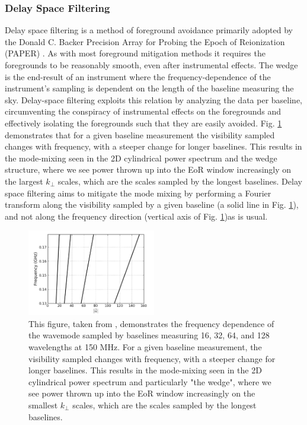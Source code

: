 \subsubsection{Delay Space Filtering}
Delay space filtering is a method of foreground avoidance primarily adopted by the Donald C. Backer Precision Array for Probing the Epoch of Reionization (PAPER) \citep{Parsons2010AJ....139.1468P}. As with most foreground mitigation methods it requires the foregrounds to be reasonably smooth, even after instrumental effects. The wedge is the end-result of an instrument where the frequency-dependence of the instrument's sampling is dependent on the length of the baseline measuring the sky. Delay-space filtering exploits this relation by analyzing the data per baseline, circumventing the conspiracy of instrumental effects on the foregrounds and effectively isolating the foregrounds such that they are easily avoided. Fig. \ref{fig:baselines} demonstrates that for a given baseline measurement the visibility sampled changes with frequency, with a steeper change for longer baselines. This results in the mode-mixing seen in the 2D cylindrical power spectrum and the wedge structure, where we see power thrown up into the EoR window increasingly on the largest $k_\bot$ scales, which are the scales sampled by the longest baselines. Delay space filtering aims to mitigate the mode mixing by performing a Fourier transform along the visibility sampled by a given baseline (a solid line in Fig. \ref{fig:baselines}), and not along the frequency direction (vertical axis of Fig. \ref{fig:baselines})as is usual.

\begin{figure}
\begin{center}
    \includegraphics[width=0.5\textwidth]{Images/baselines.png}
\end{center}
    \caption{This figure, taken from \citet{Parsons2012ApJ...756..165P}, demonstrates the frequency dependence of the wavemode sampled by baselines measuring 16, 32, 64, and 128 wavelengths at 150 MHz. For a given baseline measurement, the visibility sampled changes with frequency, with a steeper change for longer baselines. This results in the mode-mixing seen in the 2D cylindrical power spectrum and particularly "the wedge", where we see power thrown up into the EoR window increasingly on the smallest $k_\bot$ scales, which are the scales sampled by the longest baselines.}
    \label{fig:baselines}
\end{figure}

